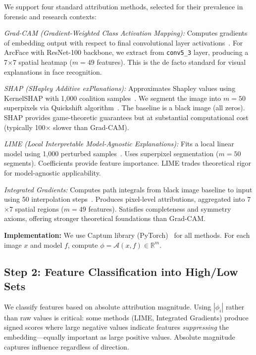 We support four standard attribution methods, selected for their prevalence in forensic and research contexts:

\textit{Grad-CAM (Gradient-Weighted Class Activation Mapping):} Computes gradients of embedding output with respect to final convolutional layer activations~\cite{selvaraju2017grad}. For ArcFace with ResNet-100 backbone, we extract from \texttt{conv5\_3} layer, producing a 7$\times$7 spatial heatmap ($m=49$ features). This is the de facto standard for visual explanations in face recognition.

\textit{SHAP (SHapley Additive exPlanations):} Approximates Shapley values using KernelSHAP with 1,000 coalition samples~\cite{lundberg2017shap}. We segment the image into $m=50$ superpixels via Quickshift algorithm~\cite{vedaldi2008quick}. The baseline is a black image (all zeros). SHAP provides game-theoretic guarantees but at substantial computational cost (typically 100$\times$ slower than Grad-CAM).

\textit{LIME (Local Interpretable Model-Agnostic Explanations):} Fits a local linear model using 1,000 perturbed samples~\cite{ribeiro2016lime}. Uses superpixel segmentation ($m=50$ segments). Coefficients provide feature importance. LIME trades theoretical rigor for model-agnostic applicability.

\textit{Integrated Gradients:} Computes path integrals from black image baseline to input using 50 interpolation steps~\cite{sundararajan2017axiomatic}. Produces pixel-level attributions, aggregated into 7$\times$7 spatial regions ($m=49$ features). Satisfies completeness and symmetry axioms, offering stronger theoretical foundations than Grad-CAM.

\textbf{Implementation:} We use Captum library (PyTorch)~\cite{kokhlikyan2020captum} for all methods. For each image $x$ and model $f$, compute $\phi = \mathcal{A}(x, f) \in \mathbb{R}^m$.

\subsection{Step 2: Feature Classification into High/Low Sets}

We classify features based on absolute attribution magnitude. Using $|\phi_i|$ rather than raw values is critical: some methods (LIME, Integrated Gradients) produce signed scores where large negative values indicate features \textit{suppressing} the embedding—equally important as large positive values. Absolute magnitude captures influence regardless of direction.

